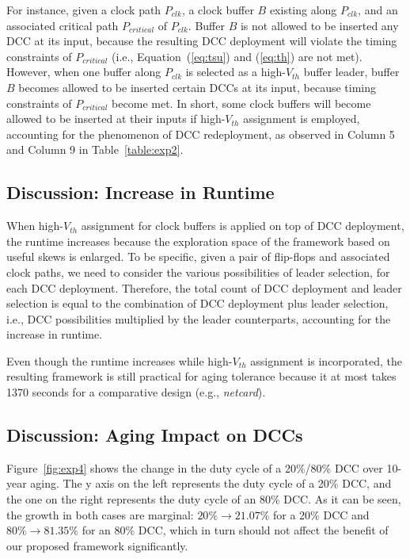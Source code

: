 For instance, given a clock path $P_{clk}$, a clock buffer $B$ existing along $P_{clk}$, and an associated critical path $P_{critical}$ of $P_{clk}$. Buffer $B$ is not allowed to be inserted any DCC at its input, because the resulting DCC deployment will violate the timing constraints of $P_{critical}$ (i.e., Equation~(\ref{eq:tsu}) and (\ref{eq:th}) are not met). However, when one buffer along $P_{clk}$ is selected as a high-$V_{th}$ buffer leader, buffer $B$ becomes allowed to be inserted certain DCCs at its input, because timing constraints of $P_{critical}$ become met. In short, some clock buffers will become allowed to be inserted at their inputs if high-$V_{th}$ assignment is employed, accounting for the phenomenon of DCC redeployment, as observed in Column 5 and Column 9 in Table~\ref{table:exp2}.

\subsection{Discussion: Increase in Runtime}
When high-$V_{th}$ assignment for clock buffers is applied on top of DCC deployment, the runtime increases because the exploration space of the framework based on useful skews is enlarged. To be specific, given a pair of flip-flops and associated clock paths, we need to consider the various possibilities of leader selection, for each DCC deployment. Therefore, the total count of DCC deployment and leader selection is equal to the combination of DCC deployment plus leader selection, i.e., DCC possibilities multiplied by the leader counterparts, accounting for the increase in runtime. 

Even though the runtime increases while high-$V_{th}$ assignment is incorporated, the resulting framework is still practical for aging tolerance because it at most takes 1370 seconds for a comparative design (e.g., \textit{netcard}).

\subsection{Discussion: Aging Impact on DCCs}

Figure~\ref{fig:exp4} shows the change in the duty cycle of a 20\%/80\% DCC over 10-year aging. The y axis on the left represents the duty cycle of a 20\% DCC, and the one on the right represents the duty cycle of an 80\% DCC. As it can be seen, the growth in both cases are marginal: $20\% \to 21.07\%$ for a 20\% DCC and $80\% \to 81.35\%$ for an 80\% DCC, which in turn should not affect the benefit of our proposed framework significantly.

